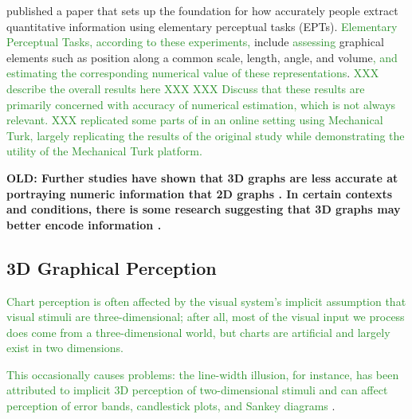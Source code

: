\documentclass[letterpaper,inpress,dvipsnames]{jdsart}
\begin{document}
\citet{cleveland_graphical_1984} published a paper that sets up the foundation for how accurately people extract quantitative information using elementary perceptual tasks (EPTs).
{\textcolor{ForestGreen}{Elementary Perceptual Tasks, according to these experiments,}} include {\textcolor{ForestGreen}{assessing}} graphical elements such as position along a common scale, length, angle, and volume{\textcolor{ForestGreen}{, and estimating the corresponding numerical value of these representations}}.
{\textcolor{ForestGreen}{XXX describe the overall results here XXX}}
{\textcolor{ForestGreen}{XXX Discuss that these results are primarily concerned with accuracy of numerical estimation, which is not always relevant. XXX}}
\citet{heerCrowdsourcingGraphicalPerception2010b} {\textcolor{ForestGreen}{replicated some parts of}} \citet{cleveland_graphical_1984} {\textcolor{ForestGreen}{in an online setting using Mechanical Turk, largely replicating the results of the original study while demonstrating the utility of the Mechanical Turk platform.}}

\textbf{OLD: Further studies have shown that 3D graphs are less accurate at portraying numeric information that 2D graphs \citep{barfield_effects_1989, fisher_data_1997}. In certain contexts and conditions, there is some research suggesting that 3D graphs may better encode information \citep{brath_3d_2014}.}

\hypertarget{d-graphical-perception}{%
\subsection{3D Graphical Perception}\label{d-graphical-perception}}

{\textcolor{ForestGreen}{Chart perception is often affected by the visual system's implicit assumption that visual stimuli are three-dimensional; after all, most of the visual input we process does come from a three-dimensional world, but charts are artificial and largely exist in two dimensions.}}

{\textcolor{ForestGreen}{This occasionally causes problems: the line-width illusion, for instance, has been attributed to implicit 3D perception of two-dimensional stimuli and can affect perception of error bands, candlestick plots, and Sankey diagrams}} \citep{vanderplasSignsSineIllusion2015, daySineIllusion1991, hofmannCommonAnglePlots2013}.
\end{document}
